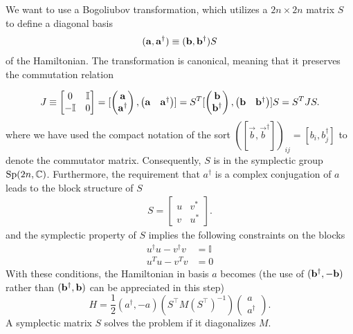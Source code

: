 We want to use a Bogoliubov transformation, which utilizes a $2n \times 2n$ matrix $S$ to define a diagonal basis 
\begin{eqnarray}\begin{aligned}
\label{eq:def_a}
({\bf a} , {\bf a}^\dagger)\equiv({\bf b} , {\bf b}^\dagger)S
\end{aligned}\end{eqnarray}
of the Hamiltonian. The transformation is canonical, meaning that it preserves the commutation relation 

\begin{eqnarray}
\begin{aligned}
\label{eq:preserve_commutator}
J\equiv\begin{bmatrix}
0 & \mathbb{I}\\
-\mathbb{I} & 0
\end{bmatrix}
=[
\begin{pmatrix}
{\bf a} \\
{\bf a}^\dagger
\end{pmatrix},
\begin{pmatrix}
{\bf a} & {\bf a}^\dagger
\end{pmatrix}]
=S^T[
\begin{pmatrix}
{\bf b} \\
{\bf b}^\dagger
\end{pmatrix},
\begin{pmatrix}
{\bf b} & {\bf b}^\dagger
\end{pmatrix}]S
=S^T JS.
\end{aligned}
\end{eqnarray}
where we have used the compact notation of the sort $([\vec{b}, \vec{b}^{\dagger}])_{ij} =  [b_i, b_j^\dagger]$ to denote the commutator matrix. Consequently, $S$ is in the symplectic group ${\rm Sp}( 2n, \mathbb{C} ) $\cite{blaizot_quantum_1986,fulton_representation_2004}. Furthermore, the requirement that $a^\dagger$ is a complex conjugation of $a$ leads to the block structure of $S$
\begin{eqnarray}
\label{eq:block_S}
S=
\begin{bmatrix}
u & v^*\\
v & u^*
\end{bmatrix}.
\end{eqnarray}
and the symplectic property of $S$ implies the following constraints on the blocks 
\begin{eqnarray}
  u^\dagger u-v^\dagger v&=\mathbb{I}\label{eq:constraint_1}\\
  u^T u-v^T v&=0\label{eq:constraint_2}
\end{eqnarray}
With these conditions, the Hamiltonian in basis $a$ becomes (the use of $({\bf b}^\dagger , -{\bf b})$ rather than $({\bf b}^\dagger , {\bf b})$ can be appreciated in this step)
\begin{equation}
H = \frac{1}{2} ( a^{\dagger}, -a )  (S^{\top} M (S^{\top})^{-1} )
\begin{pmatrix}
a\\
a^{\dagger} 
\end{pmatrix}.
\end{equation}
A symplectic matrix $S$ solves the problem if it diagonalizes $M$. 

